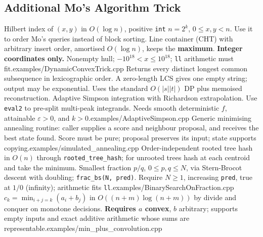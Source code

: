 \subsection{Additional Mo's Algorithm Trick}

%
{Hilbert index of $(x,y)$ in $O(\log n)$, positive \texttt{int} $n=2^k$, $0\le x,y<n$. Use it to order Mo's queries instead of block sorting.}
%
{Line container (CHT) with arbitrary insert order, amortised $O(\log n)$, keeps the \textbf{maximum}. \textbf{Integer coordinates only.} Nonempty hull; $-10^{18}<x\le10^{18}$; \texttt{ll} arithmetic must fit.}{examples/DynamicConvexTrick.cpp}
%
{Returns every distinct longest common subsequence in lexicographic order. A zero-length LCS gives one empty string; output may be exponential. Uses the standard $O(|s||t|)$ DP plus memoised reconstruction.}
%
%
{Adaptive Simpson integration with Richardson extrapolation. Use \texttt{eval2} to pre-split multi-peak integrands. Needs smooth deterministic $f$, attainable $\varepsilon>0$, and $k>0$.}{examples/AdaptiveSimpson.cpp}
%
{Generic minimising annealing routine: caller supplies a score and neighbour proposal, and receives the best state found. Score must be pure; proposal preserves its input; state supports copying.}{examples/simulated_annealing.cpp}
%
{Order-independent rooted tree hash in $O(n)$ through \texttt{rooted\_tree\_hash}; for unrooted trees hash at each centroid and take the minimum.}
%
{Smallest fraction $p/q$, $0\le p,q\le N$, via Stern-Brocot descent with doubling; \texttt{frac\_bs(N, pred)}. Require $N\ge1$, increasing \texttt{pred}, true at $1/0$ (infinity); arithmetic fits \texttt{ll}.}{examples/BinarySearchOnFraction.cpp}
%
{$c_k=\min_{i+j=k}(a_i+b_j)$ in $O((n+m)\log(n+m))$ by divide and conquer on monotone decisions. \textbf{Requires $a$ convex}, $b$ arbitrary; supports empty inputs and exact additive arithmetic whose sums are representable.}{examples/min_plus_convolution.cpp}
